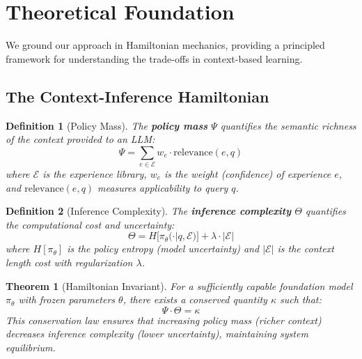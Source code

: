 \documentclass[11pt,a4paper]{article}
\newtheorem{theorem}{Theorem}
\newtheorem{definition}{Definition}
\begin{document}
\section{Theoretical Foundation}
\label{sec:theory}

We ground our approach in Hamiltonian mechanics, providing a principled framework for understanding the trade-offs in context-based learning.

\subsection{The Context-Inference Hamiltonian}

\begin{definition}[Policy Mass]
The \textbf{policy mass} $\Psi$ quantifies the semantic richness of the context provided to an LLM:
\begin{equation}
\Psi = \sum_{e \in \mathcal{E}} w_e \cdot \text{relevance}(e, q)
\end{equation}
where $\mathcal{E}$ is the experience library, $w_e$ is the weight (confidence) of experience $e$, and $\text{relevance}(e, q)$ measures applicability to query $q$.
\end{definition}

\begin{definition}[Inference Complexity]
The \textbf{inference complexity} $\Theta$ quantifies the computational cost and uncertainty:
\begin{equation}
\Theta = H[\pi_\theta(\cdot | q, \mathcal{E})] + \lambda \cdot |\mathcal{E}|
\end{equation}
where $H[\pi_\theta]$ is the policy entropy (model uncertainty) and $|\mathcal{E}|$ is the context length cost with regularization $\lambda$.
\end{definition}

\begin{theorem}[Hamiltonian Invariant]
For a sufficiently capable foundation model $\pi_\theta$ with frozen parameters $\theta$, there exists a conserved quantity $\kappa$ such that:
\begin{equation}
\Psi \cdot \Theta = \kappa
\end{equation}
This conservation law ensures that increasing policy mass (richer context) decreases inference complexity (lower uncertainty), maintaining system equilibrium.
\end{theorem}
\end{document}
